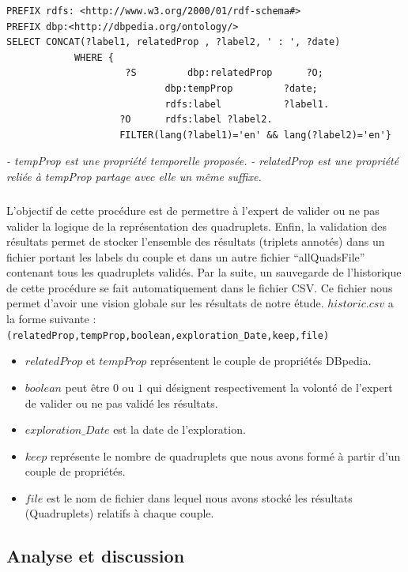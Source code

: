 \begin{verbatim}
PREFIX rdfs: <http://www.w3.org/2000/01/rdf-schema#> 
PREFIX dbp:<http://dbpedia.org/ontology/> 
SELECT CONCAT(?label1, relatedProp , ?label2, ' : ', ?date) 
			WHERE {  
					 ?S   		dbp:relatedProp 	 ?O;
							dbp:tempProp		 ?date;
							rdfs:label 			 ?label1.
					?O 		rdfs:label ?label2.
					FILTER(lang(?label1)='en' && lang(?label2)='en'}
\end{verbatim}
{\it - tempProp est une propriété temporelle proposée.}
\newline
{\it - relatedProp est une propriété reliée à tempProp partage avec elle un même suffixe.}
\subparagraph{}
L'objectif de cette procédure est de permettre à l'expert de valider ou ne pas valider la logique de la représentation des quadruplets. Enfin, la validation des résultats permet de stocker l'ensemble des résultats (triplets annotés) dans un fichier portant les labels du couple et dans un autre fichier ``allQuadsFile'' contenant tous les quadruplets validés. Par la suite, un sauvegarde de l'historique de cette procédure se fait automatiquement dans le fichier CSV. Ce fichier nous permet d'avoir une vision globale sur les résultats de notre étude. $historic.csv$ a la forme suivante :
\newline
{\tt (relatedProp,tempProp,boolean,exploration\_Date,keep,file)} 
\begin{itemize}
\item $relatedProp$ et $tempProp$ représentent le couple de propriétés DBpedia.
\item $boolean$ peut être $0$ ou $1$ qui désignent respectivement la volonté de l'expert de valider ou ne pas validé les résultats.
\item $exploration\_Date$ est la date de l'exploration.
\item $keep$ représente le nombre de quadruplets que nous avons formé à partir d'un couple de propriétés.
\item $file$ est le nom de fichier dans lequel nous avons stocké les résultats (Quadruplets) relatifs à chaque couple.
\end{itemize}
\newpage
\subsection{Analyse et discussion}
